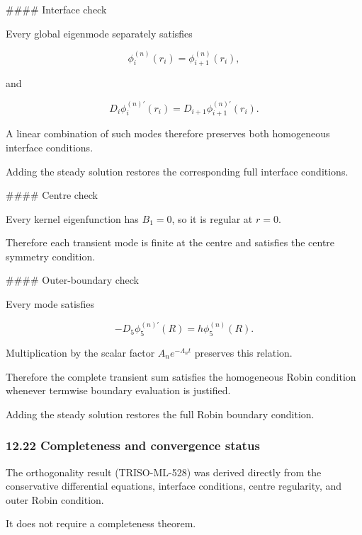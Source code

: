 \documentclass[11pt,a4paper]{article}
\begin{document}
\#\#\#\# Interface check

Every global eigenmode separately satisfies

\begin{equation}
\phi_i^{(n)}(r_i)
=
\phi_{i+1}^{(n)}(r_i),
\tag{TRISO-ML-561}
\label{eq:triso-ml-561}
\end{equation}

and

\begin{equation}
D_i\phi_i^{(n)\prime}(r_i)
=
D_{i+1}\phi_{i+1}^{(n)\prime}(r_i).
\tag{TRISO-ML-562}
\label{eq:triso-ml-562}
\end{equation}

A linear combination of such modes therefore preserves both homogeneous interface conditions.

Adding the steady solution restores the corresponding full interface conditions.

\#\#\#\# Centre check

Every kernel eigenfunction has $B_1=0$, so it is regular at $r=0$.

Therefore each transient mode is finite at the centre and satisfies the centre symmetry condition.

\#\#\#\# Outer-boundary check

Every mode satisfies

\begin{equation}
-D_5\phi_5^{(n)\prime}(R)
=
h\phi_5^{(n)}(R).
\tag{TRISO-ML-563}
\label{eq:triso-ml-563}
\end{equation}

Multiplication by the scalar factor $A_ne^{-\Lambda_nt}$ preserves this relation.

Therefore the complete transient sum satisfies the homogeneous Robin condition whenever termwise boundary evaluation is justified.

Adding the steady solution restores the full Robin boundary condition.

\subsubsection*{12.22 Completeness and convergence status}

The orthogonality result (TRISO-ML-528) was derived directly from the conservative differential equations, interface conditions, centre regularity, and outer Robin condition.

It does not require a completeness theorem.
\end{document}
